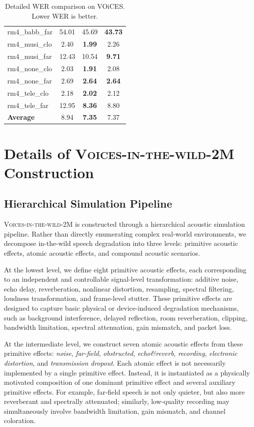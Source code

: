 \documentclass{llmxive}
\begin{document}
\begin{table}[t]
{\begin{tabular}{lccc}
rm4\_babb\_far & 54.01 & 45.69 & \textbf{43.73} \\
rm4\_musi\_clo & 2.40 & \textbf{1.99} & 2.26 \\
rm4\_musi\_far & 12.43 & 10.54 & \textbf{9.71} \\
rm4\_none\_clo & 2.03 & \textbf{1.91} & 2.08 \\
rm4\_none\_far & 2.69 & \textbf{2.64} & \textbf{2.64} \\
rm4\_tele\_clo & 2.18 & \textbf{2.02} & 2.12 \\
rm4\_tele\_far & 12.95 & \textbf{8.36} & 8.80 \\
\midrule
\textbf{Average} & 8.94 & \textbf{7.35} & 7.37 \\
\bottomrule
\end{tabular}
}
\vspace{-2mm}
\caption{
Detailed WER comparison on VOiCES. Lower WER is better.
}
\end{table}


\section{Details of  \textsc{Voices-in-the-wild-2M}  Construction}
\label{app:data_construction}

\subsection{Hierarchical Simulation Pipeline}

 \textsc{Voices-in-the-wild-2M}  is constructed through a hierarchical acoustic simulation
pipeline. Rather than directly enumerating complex real-world environments, we
decompose in-the-wild speech degradation into three levels: primitive acoustic
effects, atomic acoustic effects, and compound acoustic scenarios.

At the lowest level, we define eight primitive acoustic effects, each
corresponding to an independent and controllable signal-level transformation:
additive noise, echo delay, reverberation, nonlinear distortion, resampling,
spectral filtering, loudness transformation, and frame-level stutter. These
primitive effects are designed to capture basic physical or device-induced
degradation mechanisms, such as background interference, delayed reflection,
room reverberation, clipping, bandwidth limitation, spectral attenuation, gain
mismatch, and packet loss.

At the intermediate level, we construct seven atomic acoustic effects from these
primitive effects: \textit{noise}, \textit{far-field}, \textit{obstructed},
\textit{echo\&reverb}, \textit{recording}, \textit{electronic distortion}, and
\textit{transmission dropout}. Each atomic effect is not necessarily implemented
by a single primitive effect. Instead, it is instantiated as a physically
motivated composition of one dominant primitive effect and several auxiliary
primitive effects. For example, far-field speech is not only quieter, but also
more reverberant and spectrally attenuated; similarly, low-quality recording may
simultaneously involve bandwidth limitation, gain mismatch, and channel
coloration.
\end{document}
